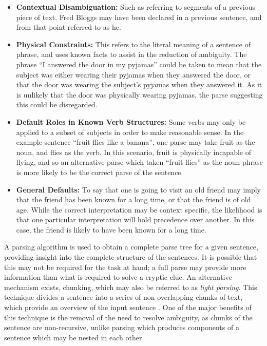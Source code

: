 \begin{itemize}
	\item\textbf{Contextual Disambiguation:}  Such as referring to segments of a previous piece of text. Fred Bloggs may have been declared in a previous sentence, and from that point referred to as he.
	\item\textbf{Physical Constraints:} This refers to the literal meaning of a sentence of phrase, and uses known facts to assist in the reduction of ambiguity. The phrase “I answered the door in my pyjamas” could be taken to mean that the subject was either wearing their pyjamas when they answered the door, or that the door was wearing the subject’s pyjamas when they answered it. As it is unlikely that the door was physically wearing pyjamas, the parse suggesting this could be disregarded.
	\item\textbf{Default Roles in Known Verb Structures:} Some verbs may only be applied to a subset of subjects in order to make reasonable sense. In the example sentence “fruit flies like a banana”, one parse may take fruit as the noun, and flies as the verb. In this scenario, fruit is physically incapable of flying, and so an alternative parse which taken “fruit flies” as the noun-phrase is more likely to be the correct parse of the sentence. 
	\item\textbf{General Defaults:} To say that one is going to visit an old friend may imply that the friend has been known for a long time, or that the friend is of old age. While the correct interpretation may be context specific, the likelihood is that one particular interpretation will hold precedence over another. In this case, the friend is likely to have been known for a long time.
\end{itemize}

\begin{flushright}
	\citep{mccluskey99}
\end{flushright}

A parsing algorithm is used to obtain a complete parse tree for a given sentence, providing insight into the complete structure of the sentences. It is possible that this may not be required for the task at hand; a full parse may provide more information than what is required to solve a cryptic clue. An alternative mechanism exists, chunking, which may also be referred to as \emph{light parsing}. This technique divides a sentence into a series of non-overlapping chunks of text, which provide an overview of the input sentence \citep{litman03}. One of the major benefits of this technique is the removal of the need to resolve ambiguity, as chunks of the sentence are non-recursive, unlike parsing which produces components of a sentence which may be nested in each other.

